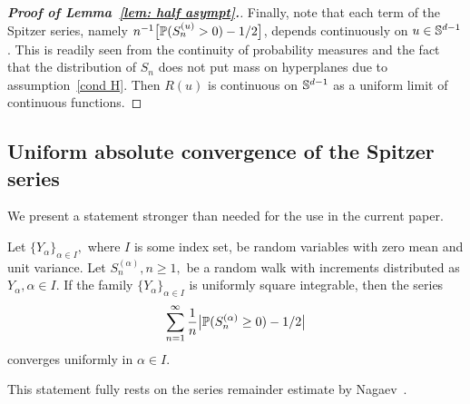 \documentclass[12pt, reqno]{amsart}
\begin{document}
\begin{proof}[\bf Proof of Lemma~\ref{lem: half asympt}.]
Finally, note that each term of the Spitzer series, namely $n^{-1}\bigl[\P(S_n^{(u)} > 0) -1/2 \bigr]$, depends continuously on $u \in \S^{d-1}$. This is readily seen from the continuity of probability measures and the fact that the distribution of $S_n$ does not put mass on hyperplanes due to assumption~\eqref{cond H}. Then $R(u)$ is continuous on $\S^{d-1}$ as a uniform limit of continuous functions. 

\end{proof}


\subsection*{Uniform absolute convergence of the Spitzer series} We present a statement stronger than needed for the use in the current paper. 

\begin{lem}
\label{lem: Uniform Spitzer}
Let $\{Y_\alpha\}_{\alpha \in I},$ where $I$ is some index set, be random variables with zero mean and unit variance. Let  $S_n^{(\alpha)}, n \ge 1,$ be a random walk with increments distributed as $Y_\alpha, \alpha \in I$. If the family $\{ Y_\alpha \}_{\alpha \in I}$ is uniformly square integrable, then the series
$$\sum_{n=1}^\infty \frac{1}{n} \bigl|\P(S_n^{(\alpha)} \ge 0) -1/2 \bigr|$$
converges uniformly in $\alpha \in I$.
\end{lem}

This statement fully rests on the series remainder estimate by Nagaev~\cite{Nagaev2009}.
\end{document}
